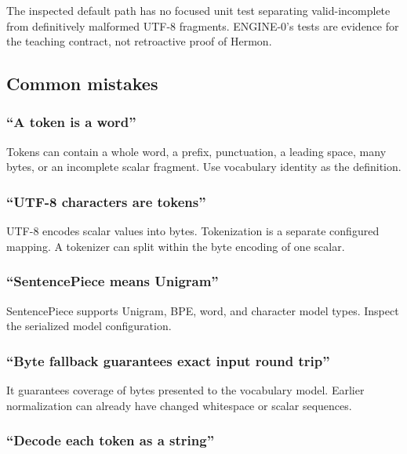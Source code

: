 \documentclass[
  10pt,
]{article}
\begin{document}
The inspected default path has no focused unit test separating
valid-incomplete from definitively malformed UTF-8 fragments. ENGINE-0's
tests are evidence for the teaching contract, not retroactive proof of
Hermon.

\subsection{Common mistakes}\label{common-mistakes-1}

\subsubsection{``A token is a word''}\label{a-token-is-a-word}

Tokens can contain a whole word, a prefix, punctuation, a leading space,
many bytes, or an incomplete scalar fragment. Use vocabulary identity as
the definition.

\subsubsection{``UTF-8 characters are
tokens''}\label{utf-8-characters-are-tokens}

UTF-8 encodes scalar values into bytes. Tokenization is a separate
configured mapping. A tokenizer can split within the byte encoding of
one scalar.

\subsubsection{``SentencePiece means
Unigram''}\label{sentencepiece-means-unigram}

SentencePiece supports Unigram, BPE, word, and character model types.
Inspect the serialized model configuration.

\subsubsection{``Byte fallback guarantees exact input round
trip''}\label{byte-fallback-guarantees-exact-input-round-trip}

It guarantees coverage of bytes presented to the vocabulary model.
Earlier normalization can already have changed whitespace or scalar
sequences.

\subsubsection{``Decode each token as a
string''}\label{decode-each-token-as-a-string}
\end{document}
